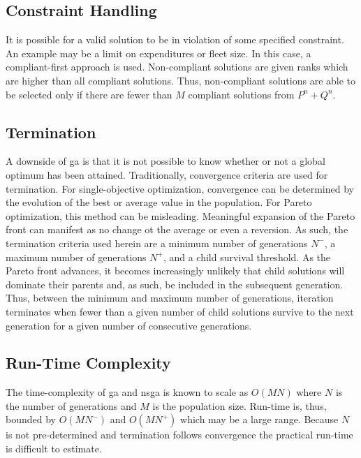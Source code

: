 \subsection{Constraint Handling}

It is possible for a valid solution to be in violation of some specified constraint. An example may be a limit on expenditures or fleet size. In this case, a compliant-first approach is used. Non-compliant solutions are given ranks which are higher than all compliant solutions. Thus, non-compliant solutions are able to be selected only if there are fewer than $M$ compliant solutions from $P^n + Q^n$.

\subsection{Termination}

A downside of \gls{ga} is that it is not possible to know whether or not a global optimum has been attained. Traditionally, convergence criteria are used for termination. For single-objective optimization, convergence can be determined by the evolution of the best or average value in the population. For Pareto optimization, this method can be misleading. Meaningful expansion of the Pareto front can manifest as no change ot the average or even a reversion. As such, the termination criteria used herein are a minimum number of generations $N^-$, a maximum number of generations $N^+$, and a child survival threshold. As the Pareto front advances, it becomes increasingly unlikely that child solutions will dominate their parents and, as such, be included in the subsequent generation. Thus, between the minimum and maximum number of generations, iteration terminates when fewer than a given number of child solutions survive to the next generation for a given number of consecutive generations.

\subsection{Run-Time Complexity}

The time-complexity of \gls{ga} and \gls{nsga} is known to scale as $O(MN)$ where $N$ is the number of generations and $M$ is the population size. Run-time is, thus, bounded by $O(MN^-)$ and $O(MN^+)$ which may be a large range. Because $N$ is not pre-determined and termination follows convergence the practical run-time is difficult to estimate.

